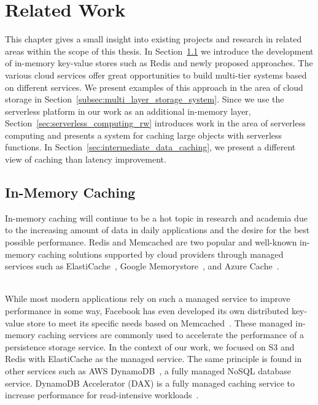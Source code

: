 \chapter{Related Work}
\label{cha:related_work}
This chapter gives a small insight into existing projects and research in related areas within the scope of this thesis. In Section~\ref{sec:in_memory_caching} we introduce the development of in-memory key-value stores such as Redis and newly proposed approaches. The various cloud services offer great opportunities to build multi-tier systems based on different services. We present examples of this approach in the area of cloud storage in Section~\ref{subsec:multi_layer_storage_system}. Since we use the serverless platform in our work as an additional in-memory layer, Section~\ref{sec:serverless_computing_rw} introduces work in the area of serverless computing and presents a system for caching large objects with serverless functions. In Section~\ref{sec:intermediate_data_caching}, we present a different view of caching than latency improvement.

\section{In-Memory Caching}
\label{sec:in_memory_caching}
In-memory caching will continue to be a hot topic in research and academia due to the increasing amount of data in daily applications and the desire for the best possible performance. Redis and Memcached are two popular and well-known in-memory caching solutions supported by cloud providers through managed services such as ElastiCache~\cite{noauthor_amazon_nodate-1}, Google Memorystore~\cite{noauthor_memorystore_nodate}, and Azure Cache~\cite{noauthor_azure_nodate}. 

~\\
While most modern applications rely on such a managed service to improve performance in some way, Facebook has even developed its own distributed key-value store to meet its specific needs based on Memcached~\cite{nishtala_scaling_nodate}. These managed in-memory caching services are commonly used to accelerate the performance of a persistence storage service. In the context of our work, we focused on S3 and Redis with ElastiCache as the managed service. The same principle is found in other services such as AWS DynamoDB~\cite{noauthor_fast_nodate}, a fully managed NoSQL database service. DynamoDB Accelerator (DAX) is a fully managed caching service to increase performance for read-intensive workloads~\cite{noauthor_amazon_2017}.

